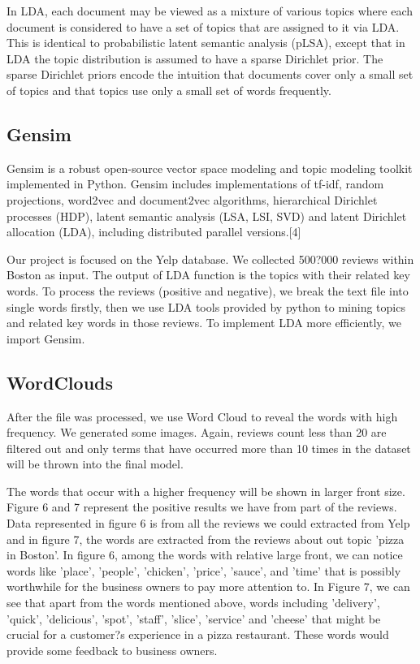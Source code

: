 \documentclass[a4paper]{article}
\begin{document}
In LDA, each document may be viewed as a mixture of various topics where each document is considered to have a set of topics that are assigned to it via LDA. This is identical to probabilistic latent semantic analysis (pLSA), except that in LDA the topic distribution is assumed to have a sparse Dirichlet prior. The sparse Dirichlet priors encode the intuition that documents cover only a small set of topics and that topics use only a small set of words frequently. 


\subsection{Gensim}
Gensim is a robust open-source vector space modeling and topic modeling toolkit implemented in Python. Gensim includes implementations of tf-idf, random projections, word2vec and document2vec algorithms, hierarchical Dirichlet processes (HDP), latent semantic analysis (LSA, LSI, SVD) and latent Dirichlet allocation (LDA), including distributed parallel versions.[4]



Our project is focused on the Yelp database. We collected 500?000 reviews within Boston as input. The output of LDA function is the topics with their related key words. To process the reviews (positive and negative), we break the text file into single words firstly, then we use LDA tools provided by python to mining topics and related key words in those reviews. To implement LDA more efficiently, we import Gensim.


\subsection{WordClouds}
After the file was processed, we use Word Cloud to reveal the words with high frequency. We generated some images. Again, reviews count less than 20 are filtered out and only terms that have occurred more than 10 times in the dataset will be thrown into the final model.
 
The words that occur with a higher frequency will be shown in larger front size. Figure 6 and 7 represent the positive results we have from part of the reviews. Data represented in figure 6 is from all the reviews we could extracted from Yelp and in figure 7, the words are extracted from the reviews about out topic 'pizza in Boston'. In figure 6, among the words with relative large front, we can notice words like 'place', 'people', 'chicken', 'price', 'sauce', and 'time' that is possibly worthwhile for the business owners to pay more attention to. In Figure 7, we can see that apart from the words mentioned above, words including 'delivery', 'quick', 'delicious', 'spot', 'staff', 'slice', 'service' and 'cheese' that might be crucial for a customer?s experience in a pizza restaurant. These words would provide some feedback to business owners.
\end{document}
